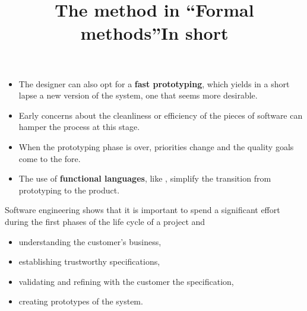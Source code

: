 \documentclass[wide]{slides}
\begin{document}
\begin{slide}
  \title{The method in ``Formal methods''}

  \begin{itemize}

    \item The designer can also opt for a \textbf{fast prototyping},
      which yields in a short lapse a new version of the system, one
      that seems more desirable.

    \item Early concerns about the cleanliness or efficiency of the
      pieces of software can hamper the process at this stage.

    \item When the prototyping phase is over, priorities change and
      the quality goals come to the fore.

    \item The use of \textbf{functional languages}, like \OCaml,
      simplify the transition from prototyping to the product.

  \end{itemize}

\end{slide}

\begin{slide}
  \title{In short}

  Software engineering shows that it is important to spend a
  significant effort during the first phases of the life cycle of a
  project and
  \begin{itemize}

    \item understanding the customer’s business,

    \item establishing trustworthy specifications,

    \item validating and refining with the customer the specification,

    \item creating prototypes of the system.

  \end{itemize}

\end{slide}
\end{document}

